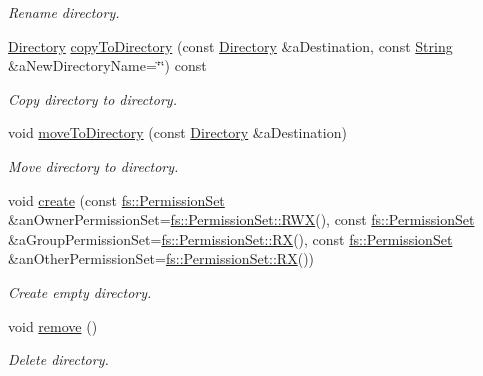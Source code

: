 \begin{DoxyCompactItemize}
\begin{DoxyCompactList}\small\item\em Rename directory. \end{DoxyCompactList}\item 
\mbox{\hyperlink{classlibrary_1_1core_1_1fs_1_1_directory}{Directory}} \mbox{\hyperlink{classlibrary_1_1core_1_1fs_1_1_directory_a47e5e9a14af43a55dd45283b62baf482}{copy\+To\+Directory}} (const \mbox{\hyperlink{classlibrary_1_1core_1_1fs_1_1_directory}{Directory}} \&a\+Destination, const \mbox{\hyperlink{classlibrary_1_1core_1_1types_1_1_string}{String}} \&a\+New\+Directory\+Name=\char`\"{}\char`\"{}) const
\begin{DoxyCompactList}\small\item\em Copy directory to directory. \end{DoxyCompactList}\item 
void \mbox{\hyperlink{classlibrary_1_1core_1_1fs_1_1_directory_a666a1ac6f84535bb113979115a760f11}{move\+To\+Directory}} (const \mbox{\hyperlink{classlibrary_1_1core_1_1fs_1_1_directory}{Directory}} \&a\+Destination)
\begin{DoxyCompactList}\small\item\em Move directory to directory. \end{DoxyCompactList}\item 
void \mbox{\hyperlink{classlibrary_1_1core_1_1fs_1_1_directory_ad1f35a8538aaccff2a64e024f3a68ddb}{create}} (const \mbox{\hyperlink{classlibrary_1_1core_1_1fs_1_1_permission_set}{fs\+::\+Permission\+Set}} \&an\+Owner\+Permission\+Set=\mbox{\hyperlink{classlibrary_1_1core_1_1fs_1_1_permission_set_aa193bcbecb0c6ebbb488e99052cbba88}{fs\+::\+Permission\+Set\+::\+R\+WX}}(), const \mbox{\hyperlink{classlibrary_1_1core_1_1fs_1_1_permission_set}{fs\+::\+Permission\+Set}} \&a\+Group\+Permission\+Set=\mbox{\hyperlink{classlibrary_1_1core_1_1fs_1_1_permission_set_adb5417e6188ca697a21723613a60b690}{fs\+::\+Permission\+Set\+::\+RX}}(), const \mbox{\hyperlink{classlibrary_1_1core_1_1fs_1_1_permission_set}{fs\+::\+Permission\+Set}} \&an\+Other\+Permission\+Set=\mbox{\hyperlink{classlibrary_1_1core_1_1fs_1_1_permission_set_adb5417e6188ca697a21723613a60b690}{fs\+::\+Permission\+Set\+::\+RX}}())
\begin{DoxyCompactList}\small\item\em Create empty directory. \end{DoxyCompactList}\item 
void \mbox{\hyperlink{classlibrary_1_1core_1_1fs_1_1_directory_a8392a637e3b8cc07f55c0bc2850fb42b}{remove}} ()
\begin{DoxyCompactList}\small\item\em Delete directory. \end{DoxyCompactList}\end{DoxyCompactItemize}
